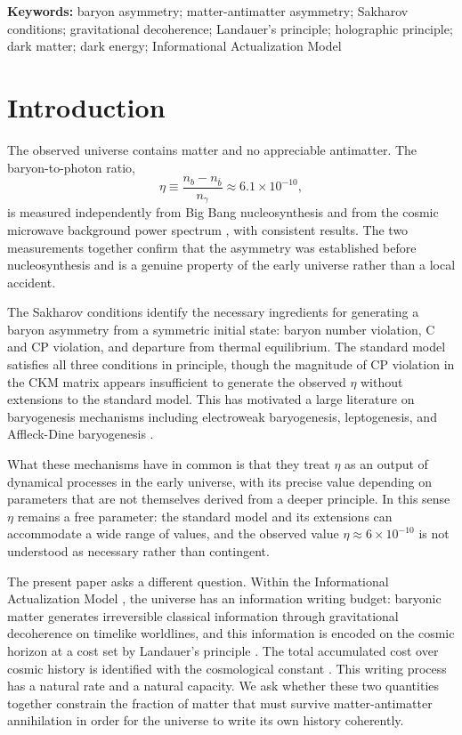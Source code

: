 \documentclass[12pt,a4paper]{article}
\begin{document}
\noindent\textbf{Keywords:} baryon asymmetry; matter-antimatter
asymmetry; Sakharov conditions; gravitational decoherence; Landauer's
principle; holographic principle; dark matter; dark energy; Informational
Actualization Model

\section{Introduction}
\label{sec:intro}

The observed universe contains matter and no appreciable antimatter. The
baryon-to-photon ratio,
\begin{equation}
\eta \equiv \frac{n_b - n_{\bar{b}}}{n_\gamma} \approx 6.1 \times 10^{-10},
\label{eq:eta_obs}
\end{equation}
is measured independently from Big Bang nucleosynthesis
\citep{cyburt2016} and from the cosmic microwave background power
spectrum \citep{planck2020}, with consistent results. The two
measurements together confirm that the asymmetry was established before
nucleosynthesis and is a genuine property of the early universe rather
than a local accident.

The Sakharov conditions \citep{sakharov1967} identify the necessary
ingredients for generating a baryon asymmetry from a symmetric initial
state: baryon number violation, C and CP violation, and departure from
thermal equilibrium. The standard model satisfies all three conditions
in principle, though the magnitude of CP violation in the CKM matrix
\citep{kobayashi1973} appears insufficient to generate the observed
$\eta$ without extensions to the standard model. This has motivated a
large literature on baryogenesis mechanisms including electroweak
baryogenesis, leptogenesis, and Affleck-Dine baryogenesis
\citep{rubakov1996,davidson2008}.

What these mechanisms have in common is that they treat $\eta$ as an
output of dynamical processes in the early universe, with its precise
value depending on parameters that are not themselves derived from a
deeper principle. In this sense $\eta$ remains a free parameter: the
standard model and its extensions can accommodate a wide range of values,
and the observed value $\eta \approx 6 \times 10^{-10}$ is not
understood as necessary rather than contingent.

The present paper asks a different question. Within the Informational
Actualization Model \citep{mahaffey2026}, the universe has an
information writing budget: baryonic matter generates irreversible
classical information through gravitational decoherence on timelike
worldlines, and this information is encoded on the cosmic horizon at a
cost set by Landauer's principle \citep{landauer1961}. The total
accumulated cost over cosmic history is identified with the cosmological
constant \citep{mahaffey2026_cc}. This writing process has a natural
rate and a natural capacity. We ask whether these two quantities
together constrain the fraction of matter that must survive
matter-antimatter annihilation in order for the universe to write its
own history coherently.
\end{document}
